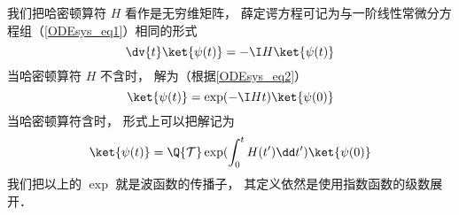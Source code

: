 我们把哈密顿算符 $H$ 看作是无穷维矩阵， 薛定谔方程可记为与一阶线性常微分方程组（\autoref{ODEsys_eq1}）相同的形式
\begin{equation}
\dv{t} \ket{\psi(t)} = -\I H \ket{\psi(t)}
\end{equation}
当哈密顿算符 $H$ 不含时， 解为（根据\autoref{ODEsys_eq2}）
\begin{equation}
\ket{\psi(t)} = \exp(-\I H t) \ket{\psi(0)}
\end{equation}
当哈密顿算符含时， 形式上可以把解记为
\begin{equation}
\ket{\psi(t)} = \Q {\mathcal T} \exp(\int_0^ t H(t')\dd t') \ket{\psi(0)}
\end{equation}
我们把以上的 $\exp$ 就是波函数的传播子， 其定义依然是使用指数函数的级数展开．
